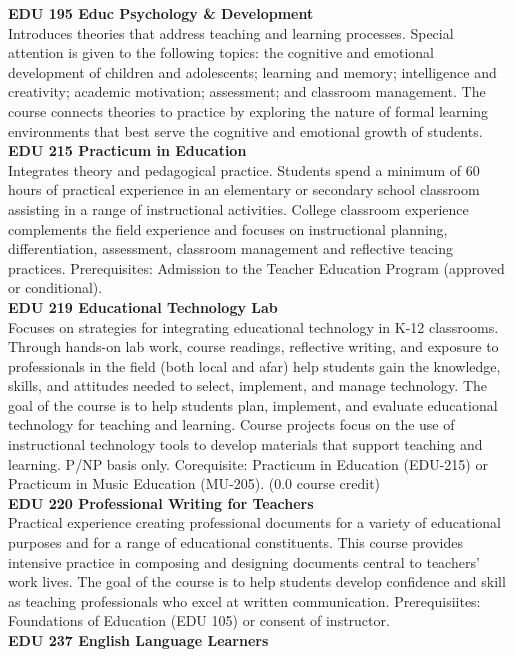 \documentclass[
  letterpaper,
]{scrbook}
\begin{document}
\textbf{EDU 195 Educ Psychology \& Development}\\
Introduces theories that address teaching and learning processes.
Special attention is given to the following topics: the cognitive and
emotional development of children and adolescents; learning and memory;
intelligence and creativity; academic motivation; assessment; and
classroom management. The course connects theories to practice by
exploring the nature of formal learning environments that best serve the
cognitive and emotional growth of students.\\
\textbf{EDU 215 Practicum in Education}\\
Integrates theory and pedagogical practice. Students spend a minimum of
60 hours of practical experience in an elementary or secondary school
classroom assisting in a range of instructional activities. College
classroom experience complements the field experience and focuses on
instructional planning, differentiation, assessment, classroom
management and reflective teacing practices. Prerequisites: Admission to
the Teacher Education Program (approved or conditional).\\
\textbf{EDU 219 Educational Technology Lab}\\
Focuses on strategies for integrating educational technology in K-12
classrooms. Through hands-on lab work, course readings, reflective
writing, and exposure to professionals in the field (both local and
afar) help students gain the knowledge, skills, and attitudes needed to
select, implement, and manage technology. The goal of the course is to
help students plan, implement, and evaluate educational technology for
teaching and learning. Course projects focus on the use of instructional
technology tools to develop materials that support teaching and
learning. P/NP basis only. Corequisite: Practicum in Education (EDU-215)
or Practicum in Music Education (MU-205). (0.0 course credit)\\
\textbf{EDU 220 Professional Writing for Teachers}\\
Practical experience creating professional documents for a variety of
educational purposes and for a range of educational constituents. This
course provides intensive practice in composing and designing documents
central to teachers' work lives. The goal of the course is to help
students develop confidence and skill as teaching professionals who
excel at written communication. Prerequisiites: Foundations of Education
(EDU 105) or consent of instructor.\\
\textbf{EDU 237 English Language Learners}\\
\end{document}
